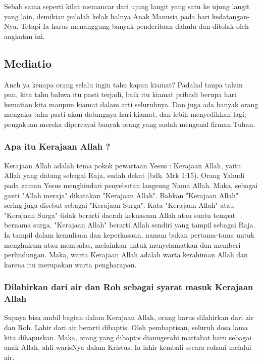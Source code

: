 \documentclass[a5paper,headsepline,titlepage,11pt,nnormalheadings,DIVcalc]{scrbook}
\begin{document}
Sebab sama seperti kilat memancar dari ujung langit yang satu ke ujung langit yang lain, demikian pulalah kelak halnya Anak Manusia pada hari kedatangan-Nya.
Tetapi Ia harus menanggung banyak penderitaan dahulu dan ditolak oleh angkatan ini.

\subsection*{Mediatio}
      Aneh ya kenapa orang selalu ingin tahu kapan kiamat? Padahal tanpa
tahun pun, kita tahu bahwa itu pasti terjadi, baik itu kiamat pribadi berupa
hari kematian kita maupun kiamat dalam arti seluruhnya. Dan juga ada banyak
orang mengaku tahu pasti akan datangnya hari kiamat, dan lebih menyedihkan
lagi, pengakuan mereka dipercayai banyak orang yang sudah mengenal firman
Tuhan.


\subsubsection*{Apa itu Kerajaan Allah ?}

Kerajaan Allah adalah tema pokok pewartaan Yesus : Kerajaan Allah, yaitu Allah yang datang sebagai Raja, sudah dekat (bdk. Mrk 1:15). Orang Yahudi pada zaman Yesus menghindari penyebutan langsung Nama Allah. Maka, sebagai ganti "Allah meraja" dikatakan "Kerajaan Allah". Bahkan "Kerajaan Allah" sering juga disebut sebagai "Kerajaan Surga". Kata "Kerajaan Allah" atau "Kerajaan Surga" tidak berarti daerah kekuasaan Allah atau suatu tempat bernama surga. "Kerajaan Allah" berarti Allah sendiri yang tampil sebagai Raja. Ia tampil dalam kemuliaan dan keperkasaan, namun bukan pertama-tama untuk menghukum atau membalas, melainkan untuk menyelamatkan dan memberi perlindungan. Maka, warta Kerajaan Allah adalah warta kerahiman Allah dan karena itu merupakan warta pengharapan.

 

\subsubsection*{Dilahirkan dari air dan Roh sebagai syarat masuk Kerajaan Allah}

Supaya bisa ambil bagian dalam Kerajaan Allah, orang harus dilahirkan dari air dan Roh. Lahir dari air berarti dibaptis. Oleh pembaptisan, seluruh dosa lama kita dihapuskan. Maka, orang yang dibaptis dianugerahi martabat baru sebagai anak Allah, ahli warisNya dalam Kristus. Ia lahir kembali secara rohani melalui air.
\end{document}
